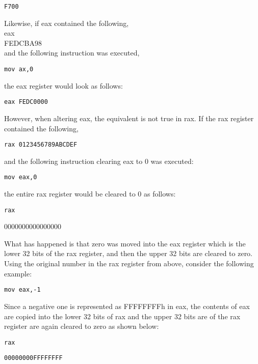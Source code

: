 \documentclass[10pt]{article}
\begin{document}
\begin{verbatim}
F700
\end{verbatim}

Likewise, if eax contained the following,\\
eax\\
FEDCBA98\\
and the following instruction was executed,

\begin{verbatim}
mov ax,0
\end{verbatim}

the eax register would look as follows:

\begin{verbatim}
eax FEDC0000
\end{verbatim}

However, when altering eax, the equivalent is not true in rax. If the rax register contained the following,

\begin{verbatim}
rax 0123456789ABCDEF
\end{verbatim}

and the following instruction clearing eax to 0 was executed:

\begin{verbatim}
mov eax,0
\end{verbatim}

the entire rax register would be cleared to 0 as follows:

\begin{verbatim}
rax
\end{verbatim}

0000000000000000

What has happened is that zero was moved into the eax register which is the lower 32 bits of the rax register, and then the upper 32 bits are cleared to zero. Using the original number in the rax register from above, consider the following example:

\begin{verbatim}
mov eax,-1
\end{verbatim}

Since a negative one is represented as FFFFFFFFh in eax, the contents of eax are copied into the lower 32 bits of rax and the upper 32 bits are of the rax register are again cleared to zero as shown below:

\begin{verbatim}
rax
\end{verbatim}

\begin{verbatim}
00000000FFFFFFFF
\end{verbatim}
\end{document}
